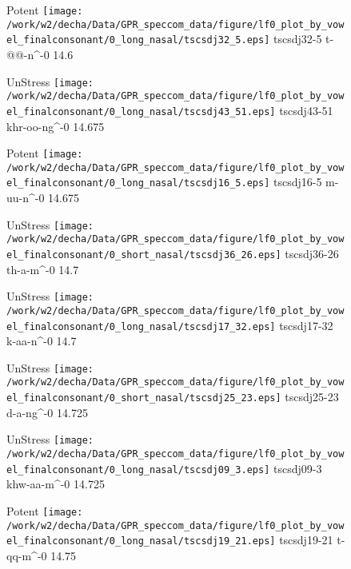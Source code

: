 \documentclass{article}
\begin{document}
\begin{figure}[t]
\begin{minipage}[b]{.24\textwidth}
\colorbox{Apricot}{Potent}
\centering
\texttt{[image: /work/w2/decha/Data/GPR\_speccom\_data/figure/lf0\_plot\_by\_vowel\_finalconsonant/0\_long\_nasal/tscsdj32\_5.eps]}
tscsdj32-5 t-@@-n\textasciicircum-0 14.6
\end{minipage}
\begin{minipage}[b]{.24\textwidth}
UnStress
\centering
\texttt{[image: /work/w2/decha/Data/GPR\_speccom\_data/figure/lf0\_plot\_by\_vowel\_finalconsonant/0\_long\_nasal/tscsdj43\_51.eps]}
tscsdj43-51 khr-oo-ng\textasciicircum-0 14.675
\end{minipage}
\begin{minipage}[b]{.24\textwidth}
\colorbox{Apricot}{Potent}
\centering
\texttt{[image: /work/w2/decha/Data/GPR\_speccom\_data/figure/lf0\_plot\_by\_vowel\_finalconsonant/0\_long\_nasal/tscsdj16\_5.eps]}
tscsdj16-5 m-uu-n\textasciicircum-0 14.675
\end{minipage}
\begin{minipage}[b]{.24\textwidth}
UnStress
\centering
\texttt{[image: /work/w2/decha/Data/GPR\_speccom\_data/figure/lf0\_plot\_by\_vowel\_finalconsonant/0\_short\_nasal/tscsdj36\_26.eps]}
tscsdj36-26 th-a-m\textasciicircum-0 14.7
\end{minipage}
\end{figure}
\clearpage
\begin{figure}[t]
\begin{minipage}[b]{.24\textwidth}
UnStress
\centering
\texttt{[image: /work/w2/decha/Data/GPR\_speccom\_data/figure/lf0\_plot\_by\_vowel\_finalconsonant/0\_long\_nasal/tscsdj17\_32.eps]}
tscsdj17-32 k-aa-n\textasciicircum-0 14.7
\end{minipage}
\begin{minipage}[b]{.24\textwidth}
UnStress
\centering
\texttt{[image: /work/w2/decha/Data/GPR\_speccom\_data/figure/lf0\_plot\_by\_vowel\_finalconsonant/0\_short\_nasal/tscsdj25\_23.eps]}
tscsdj25-23 d-a-ng\textasciicircum-0 14.725
\end{minipage}
\begin{minipage}[b]{.24\textwidth}
UnStress
\centering
\texttt{[image: /work/w2/decha/Data/GPR\_speccom\_data/figure/lf0\_plot\_by\_vowel\_finalconsonant/0\_long\_nasal/tscsdj09\_3.eps]}
tscsdj09-3 khw-aa-m\textasciicircum-0 14.725
\end{minipage}
\begin{minipage}[b]{.24\textwidth}
\colorbox{Apricot}{Potent}
\centering
\texttt{[image: /work/w2/decha/Data/GPR\_speccom\_data/figure/lf0\_plot\_by\_vowel\_finalconsonant/0\_long\_nasal/tscsdj19\_21.eps]}
tscsdj19-21 t-qq-m\textasciicircum-0 14.75
\end{minipage}
\end{figure}
\end{document}
